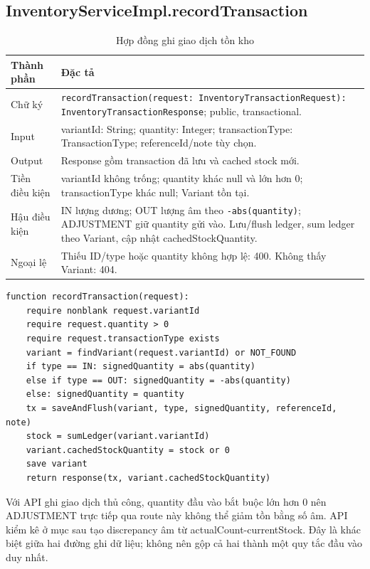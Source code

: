 \documentclass[12pt,a4paper,oneside]{report}
\begin{document}
\subsection{InventoryServiceImpl.recordTransaction}
\begin{table}[htbp]
\centering\small
\caption{Hợp đồng ghi giao dịch tồn kho}
\begin{tabularx}{\textwidth}{@{}p{3.1cm}Y@{}}\toprule
Thành phần & Đặc tả\\\midrule
Chữ ký & \texttt{recordTransaction(request: InventoryTransactionRequest): InventoryTransactionResponse}; public, transactional.\\
Input & variantId: String; quantity: Integer; transactionType: TransactionType; referenceId/note tùy chọn.\\
Output & Response gồm transaction đã lưu và cached stock mới.\\
Tiền điều kiện & variantId không trống; quantity khác null và lớn hơn 0; transactionType khác null; Variant tồn tại.\\
Hậu điều kiện & IN lượng dương; OUT lượng âm theo \texttt{-abs(quantity)}; ADJUSTMENT giữ quantity gửi vào. Lưu/flush ledger, sum ledger theo Variant, cập nhật cachedStockQuantity.\\
Ngoại lệ & Thiếu ID/type hoặc quantity không hợp lệ: 400. Không thấy Variant: 404.\\
\bottomrule\end{tabularx}
\end{table}

\begin{lstlisting}[style=pseudo]
function recordTransaction(request):
    require nonblank request.variantId
    require request.quantity > 0
    require request.transactionType exists
    variant = findVariant(request.variantId) or NOT_FOUND
    if type == IN: signedQuantity = abs(quantity)
    else if type == OUT: signedQuantity = -abs(quantity)
    else: signedQuantity = quantity
    tx = saveAndFlush(variant, type, signedQuantity, referenceId, note)
    stock = sumLedger(variant.variantId)
    variant.cachedStockQuantity = stock or 0
    save variant
    return response(tx, variant.cachedStockQuantity)
\end{lstlisting}

Với API ghi giao dịch thủ công, quantity đầu vào bắt buộc lớn hơn 0 nên ADJUSTMENT trực tiếp qua route này không thể giảm tồn bằng số âm. API kiểm kê ở mục sau tạo discrepancy âm từ actualCount-currentStock. Đây là khác biệt giữa hai đường ghi dữ liệu; không nên gộp cả hai thành một quy tắc đầu vào duy nhất.
\end{document}
